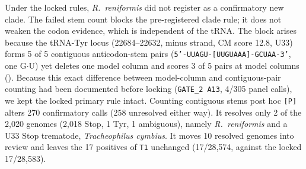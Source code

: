 \documentclass[11pt, a4paper]{article}
\begin{document}
Under the locked rules, \textit{R.\ reniformis} did not register as a confirmatory new clade. The failed stem count blocks the pre-registered clade rule; it does not weaken the codon evidence, which is independent of the tRNA. The block arises because the tRNA-Tyr locus (22684--22632, minus strand, CM score 12.8, U33) forms 5 of 5 contiguous anticodon-stem pairs (\texttt{5'-UUAGU-[UUGUAAA]-GCUAA-3'}, one G$\cdot$U) yet deletes one model column and scores 3 of 5 pairs at model columns (). Because this exact difference between model-column and contiguous-pair counting had been documented before locking (\texttt{GATE\_2 A13}, 4/305 panel calls), we kept the locked primary rule intact. Counting contiguous stems post hoc \texttt{[P]} alters 270 confirmatory calls (258 unresolved either way). It resolves only 2 of the 2,020  genomes (2,018 Stop, 1 Tyr, 1 ambiguous), namely \textit{R.\ reniformis} and a U33 Stop trematode, \textit{Tracheophilus cymbius}. It moves 10 resolved genomes into review and leaves the 17 positives of \texttt{T1} unchanged (17/28,574, against the locked 17/28,583).
\end{document}
